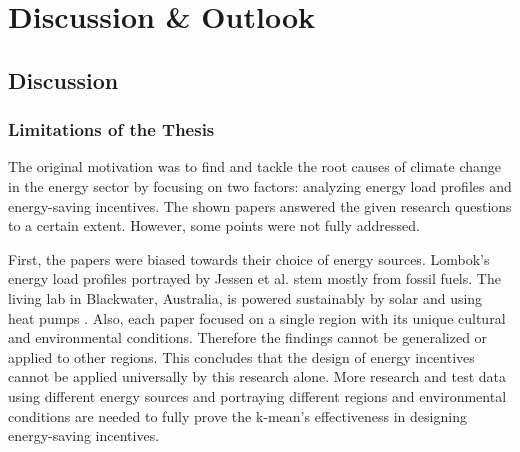 \chapter{Discussion \& Outlook}
\label{cha:discussion}




\section{Discussion}
\subsection{Limitations of the Thesis}
The original motivation was to find and tackle the root causes of climate change in the energy sector by focusing on two factors: analyzing energy load profiles and energy-saving incentives.
The shown papers answered the given research questions to a certain extent.
However, some points were not fully addressed.

First, the papers were biased towards their choice of energy sources.
Lombok's energy load profiles portrayed by Jessen et al. \cite{JES-IND} stem mostly from fossil fuels.
The living lab in Blackwater, Australia, is powered sustainably by solar and using heat pumps \cite{MAL-HBP}.
Also, each paper focused on a single region with its unique cultural and environmental conditions.
Therefore the findings cannot be generalized or applied to other regions.
This concludes that the design of energy incentives cannot be applied universally by this research alone.
More research and test data using different energy sources and portraying different regions and environmental conditions are needed to fully prove the k-mean's effectiveness in designing energy-saving incentives. 

